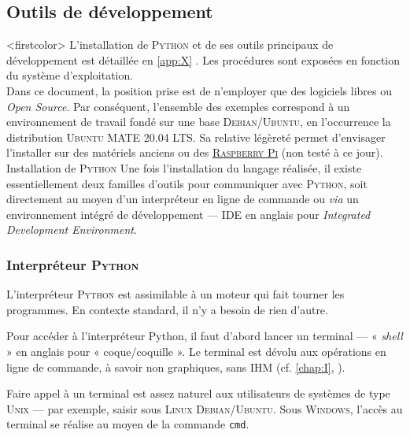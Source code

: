 \subsection[Outils de développement]{Outils de développement}
\label{sec:X.1.2}

\caution[t]<firstcolor>{%
L'installation de \textsc{Python} et de ses outils principaux de développement est détaillée en \cref{app:X} . Les procédures sont exposées en fonction du système d'exploitation.\\
Dans ce document, la position prise est de n'employer que des logiciels libres ou \textit{Open Source}. Par conséquent, l'ensemble des exemples correspond à un environnement de travail fondé sur une base \textsc{Debian}/\textsc{Ubuntu}, en l'occurrence la distribution \textsc{Ubuntu MATE} 20.04 LTS. Sa relative légèreté permet d'envisager l'installer sur des matériels anciens ou des \href{https://ubuntu-mate.org/download/}{\textsc{Raspberry Pi}} (non testé à ce jour).}%
{Installation de \textsc{Python}}%
Une fois l'installation du langage réalisée, il existe essentiellement deux familles d'outils pour communiquer avec \textsc{Python}, soit directement au moyen d'un interpréteur en ligne de commande ou \textit{via} un environnement intégré de développement --- IDE en anglais pour \textit{Integrated Development Environment}.

\subsubsection[Interpréteur \textsc{Python}]{Interpréteur \textsc{Python}}
\label{subsub:X.1.2.1}

L'interpréteur \textsc{Python} est assimilable à un moteur qui fait tourner les programmes. En contexte standard, il n'y a besoin de rien d'autre.

Pour accéder à l'interpréteur Python, il faut d'abord lancer un terminal --- « \textit{shell} » en anglais pour « coque/coquille ». Le terminal est dévolu aux opérations en ligne de commande, à savoir non graphiques, sans IHM (cf. \cref{chap:I}, ).

Faire appel à un terminal est assez naturel aux utilisateurs de systèmes de type \textsc{Unix} --- par exemple, saisir  sous \textsc{Linux} \textsc{Debian}/\textsc{Ubuntu}. Sous \textsc{Windows}, l'accès au terminal se réalise au moyen de la commande \texttt{cmd}.


